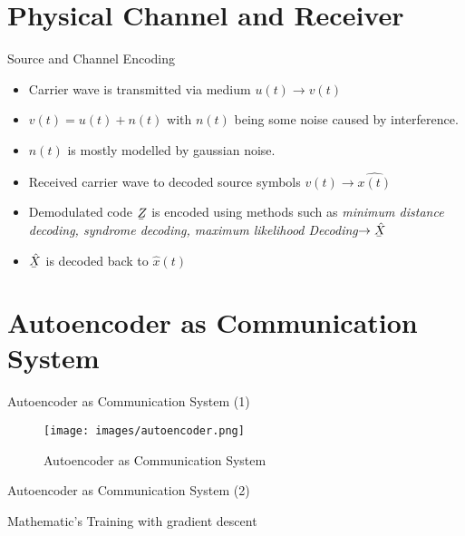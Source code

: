 \documentclass[xcolor=table,mathserif,9pt]{beamer}    %
\newcommand{\ubar}[1]{\underaccent{\bar}{#1}}
\begin{document}
\section{Physical Channel and Receiver}
\begin{frame}{Source and Channel Encoding}

\vspace{1em}
\begin{itemize}
	\item Carrier wave is transmitted via medium $u(t) \to v(t)$
	\item $v(t) = u(t) + n(t)$ with $n(t)$ being some noise caused by interference. 
	\item $n(t)$ is mostly modelled by gaussian noise.
\end{itemize}

\vspace{2em}

\vspace{1em}
\begin{itemize}
	\item Received carrier wave to decoded source symbols $v(t) \to \hat{x(t)}$
	\item Demodulated code $\ubar{Z}$ is encoded using methods such as \emph{minimum distance decoding, syndrome decoding, maximum
		likelihood Decoding}$\to \ubar{\hat{X}}$
	\item $\ubar{\hat{X}}$ is decoded back to $\hat{x}(t)$ 
\end{itemize}

\end{frame}

\section{Autoencoder as Communication System}
\begin{frame}{Autoencoder as Communication System (1)}

\begin{figure}[htpb]
	\centering
	\texttt{[image: images/autoencoder.png]}
	\caption{Autoencoder as Communication System}
	\label{fig:autoencoder}
\end{figure}

\end{frame}

\begin{frame}{Autoencoder as Communication System (2)}

Mathematic's
Training with gradient descent

\end{frame}
\end{document}
